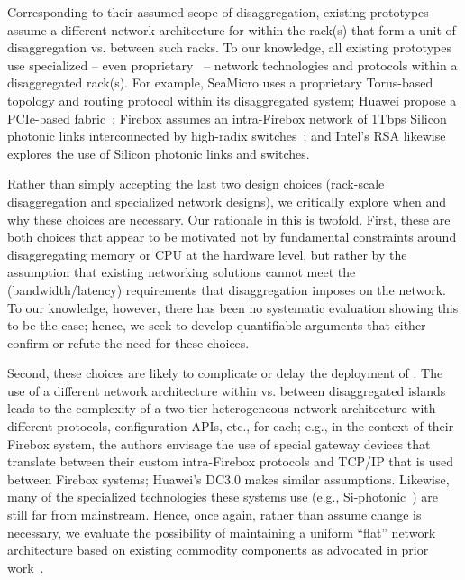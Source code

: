 Corresponding to their assumed scope of disaggregation, existing prototypes assume a different network architecture for within the rack(s) that form a unit of disaggregation vs. between such racks. To our knowledge, all existing \dis prototypes use specialized -- even proprietary~\cite{seamicro,huawei,rsa} -- network technologies and protocols within a disaggregated rack(s). For example, SeaMicro uses a proprietary Torus-based topology and routing protocol within its disaggregated system; Huawei propose a PCIe-based fabric~\cite{huawei1}; Firebox assumes an intra-Firebox network of 1Tbps Silicon photonic links interconnected by high-radix switches~\cite{firebox,vladimir}; and Intel's RSA likewise explores the use of Silicon photonic links and switches. 

Rather than simply accepting the last two design choices (rack-scale disaggregation and specialized network designs), we critically explore when and why these choices are necessary. Our rationale in this is twofold. 
First, these are both choices that appear to be motivated not by fundamental constraints around disaggregating memory or CPU at the hardware level, but rather by the assumption that existing networking solutions cannot meet the (bandwidth/latency) requirements that disaggregation imposes on the network. To our knowledge, however, there has been no systematic evaluation showing this to be the case; hence, we seek to develop quantifiable arguments that either confirm or refute the need for these choices. 

Second, these choices are likely to complicate or delay the deployment of \dis. The use of a different network architecture within vs. between disaggregated islands leads to the complexity of a two-tier heterogeneous network architecture with different protocols, configuration APIs, etc., for each; e.g., in the context of their Firebox system, the authors envisage the use of special gateway devices that translate between their custom intra-Firebox protocols and TCP/IP that is used between Firebox systems; Huawei's DC3.0 makes similar assumptions. Likewise, many of the specialized technologies these systems use (e.g., Si-photonic~\cite{vladimir-nature}) are still far from mainstream. 
Hence, once again, rather than assume change is necessary, we evaluate the possibility of maintaining a uniform ``flat'' network architecture based on existing commodity components as advocated in prior work~\cite{el-fares,vl2,greenberg-costs}. 
%
%
%
